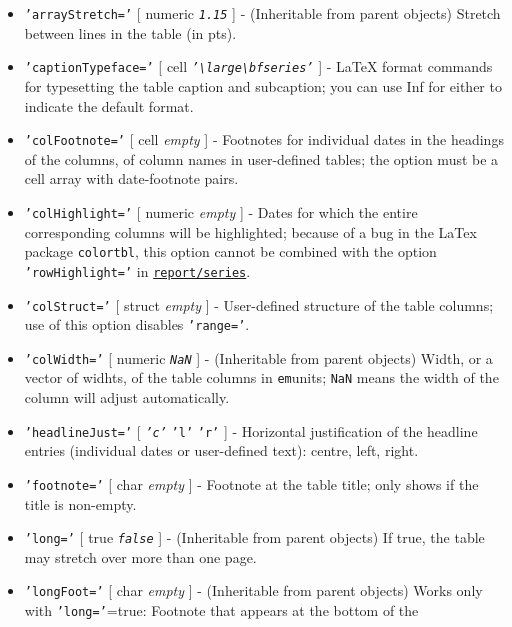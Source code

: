 \begin{itemize}
\item
  \texttt{'arrayStretch='} {[} numeric \textbar{} \emph{\texttt{1.15}}
  {]} - (Inheritable from parent objects) Stretch between lines in the
  table (in pts).
\item
  \texttt{'captionTypeface='} {[} cell \textbar{}
  \emph{\texttt{'\textbackslash{}large\textbackslash{}bfseries'}} {]} -
  LaTeX format commands for typesetting the table caption and
  subcaption; you can use Inf for either to indicate the default format.
\item
  \texttt{'colFootnote='} {[} cell \textbar{} \emph{empty} {]} -
  Footnotes for individual dates in the headings of the columns, of
  column names in user-defined tables; the option must be a cell array
  with date-footnote pairs.
\item
  \texttt{'colHighlight='} {[} numeric \textbar{} \emph{empty} {]} -
  Dates for which the entire corresponding columns will be highlighted;
  because of a bug in the LaTex package \texttt{colortbl}, this option
  cannot be combined with the option \texttt{'rowHighlight='} in
  \href{report/series}{\texttt{report/series}}.
\item
  \texttt{'colStruct='} {[} struct \textbar{} \emph{empty} {]} -
  User-defined structure of the table columns; use of this option
  disables \texttt{'range='}.
\item
  \texttt{'colWidth='} {[} numeric \textbar{} \emph{\texttt{NaN}} {]} -
  (Inheritable from parent objects) Width, or a vector of widhts, of the
  table columns in \texttt{em}units; \texttt{NaN} means the width of the
  column will adjust automatically.
\item
  \texttt{'headlineJust='} {[} \emph{\texttt{'c'}} \textbar{}
  \texttt{'l'} \textbar{} \texttt{'r'} {]} - Horizontal justification of
  the headline entries (individual dates or user-defined text): centre,
  left, right.
\item
  \texttt{'footnote='} {[} char \textbar{} \emph{empty} {]} - Footnote
  at the table title; only shows if the title is non-empty.
\item
  \texttt{'long='} {[} true \textbar{} \emph{\texttt{false}} {]} -
  (Inheritable from parent objects) If true, the table may stretch over
  more than one page.
\item
  \texttt{'longFoot='} {[} char \textbar{} \emph{empty} {]} -
  (Inheritable from parent objects) Works only with
  \texttt{'long='}=true: Footnote that appears at the bottom of the

\end{itemize}
